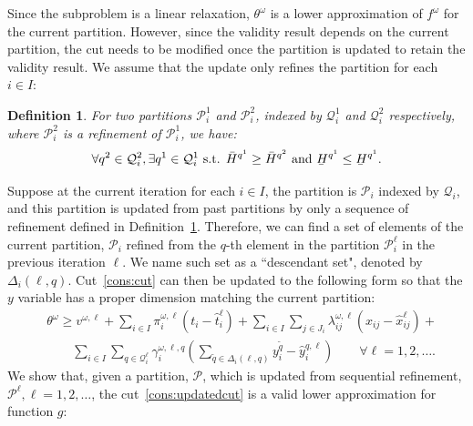 \documentclass[11pt]{article}
\newtheorem{definition}{Definition}
\newcommand{\noi}{\noindent}
\renewcommand{\underbar}{\underaccent{\bar}}
\begin{document}
	Since the subproblem is a linear relaxation, \(\theta^\omega\) is a lower approximation of \(f^\omega\) for the current partition. However, since the validity result depends on the current partition, the cut needs to be modified once the partition is updated to retain the validity result. We assume that the update only refines the partition for each \(i \in I\):
	\begin{definition} \label{definition:refinement}
		For two partitions \(\mathcal{P}^1_i\) and \(\mathcal{P}^2_i\), indexed by \(\mathcal{Q}^1_i\) and \(\mathcal{Q}^2_i\) respectively, where \(\mathcal{P}^2_i\) is a refinement of \(\mathcal{P}^1_i\), we have:
		\begin{equation*}
		\forall q^2 \in \mathcal{Q}^2_i, \exists q^1 \in \mathcal{Q}^1_i \text{ s.t. } \bar{H}^{q^1} \geq \bar{H}^{q^2} \text{ and } \underbar{H}^{q^1} \leq \underbar{H}^{q^1}.
		\end{equation*}
	\end{definition}
	\noi Suppose at the current iteration for each \(i \in I\), the partition is \(\mathcal{P}_i\) indexed by \(\mathcal{Q}_i\), and this partition is updated from past partitions by only a sequence of refinement defined in Definition~\ref{definition:refinement}. Therefore, we can find a set of elements of the current partition,  \(\mathcal{P}_i\) refined from the \(q\)-th element in the partition \(\mathcal{P}^\ell_i\) in the previous iteration \(\ell\). We name such set as a ``descendant set", denoted by \(\Delta_i(\ell,q)\). Cut~\eqref{cons:cut} can then be updated to the following form so that the \(y\) variable has a proper dimension matching the current partition:
	\begin{align} \label{cons:updatedcut}
		& \theta^\omega \geq v^{\omega,\ell} + \sum_{i \in I} \pi_i^{\omega,\ell} (t_i - \hat{t}_i^{\ell}) + \sum_{i \in I} \sum_{j \in J_i} \lambda_{ij}^{\omega,\ell} (x_{ij} - \hat{x}_{ij}^{\ell}) + \nonumber \\
		& \qquad \sum_{i \in I} \sum_{q \in \mathcal{Q}^{\ell}_i} \gamma_{i}^{\omega,\ell,q} \left( \sum_{\tilde{q} \in \Delta_i(\ell,q)} y_i^{\tilde{q}} - \hat{y}_i^{q,\ell} \right) \qquad \forall \ell = 1,2, \dots.
	\end{align}
	We show that, given a partition, \(\mathcal{P}\), which is updated from sequential refinement, \(\mathcal{P}^\ell, \ell = 1,2,\dots\), the cut~\eqref{cons:updatedcut} is a valid lower approximation for function \(g\):
\end{document}

